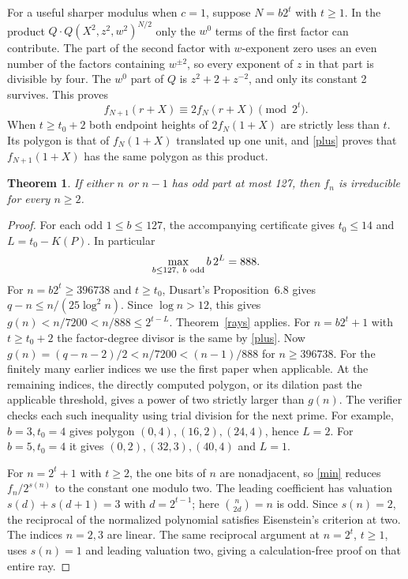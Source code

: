 \documentclass[11pt]{article}
\newtheorem{theorem}{Theorem}
\begin{document}
For a useful sharper modulus when $c=1$, suppose $N=b2^t$ with $t\ge1$. In the product $Q\cdot Q(X^2,z^2,w^2)^{N/2}$ only the $w^0$ terms of the first factor can contribute. The part of the second factor with $w$-exponent zero uses an even number of the factors containing $w^{\pm2}$, so every exponent of $z$ in that part is divisible by four. The $w^0$ part of $Q$ is $z^2+2+z^{-2}$, and only its constant 2 survives. This proves
\begin{equation}
 f_{N+1}(r+X)\equiv 2 f_N(r+X)\pmod {2^t}.\label{plus}
\end{equation}
When $t\ge t_0+2$ both endpoint heights of $2 f_N(1+X)$ are strictly less than $t$. Its polygon is that of $f_N(1+X)$ translated up one unit, and \eqref{plus} proves that $f_{N+1}(1+X)$ has the same polygon as this product.
\begin{theorem}
If either $n$ or $n-1$ has odd part at most 127, then $f_n$ is irreducible for every $n\ge2$.
\end{theorem}
\begin{proof}
For each odd $1\le b\le127$, the accompanying certificate gives $t_0\le14$ and $L=t_0-K(P)$. In particular
\[
 \max_{b\le 127,\ b\ {\rm odd}} b\,2^L=888.
\]
For $n=b2^t\ge396738$ and $t\ge t_0$, Dusart's Proposition~6.8 \cite{dusart} gives $q-n\le n/(25\log^2 n)$. Since $\log n>12$, this gives $g(n)<n/7200<n/888\le2^{t-L}$. Theorem~\ref{rays} applies. For $n=b2^t+1$ with $t\ge t_0+2$ the factor-degree divisor is the same by \eqref{plus}. Now $g(n)=(q-n-2)/2<n/7200<(n-1)/888$ for $n\ge396738$. For the finitely many earlier indices we use the first paper when applicable. At the remaining indices, the directly computed polygon, or its dilation past the applicable threshold, gives a power of two strictly larger than $g(n)$. The verifier checks each such inequality using trial division for the next prime. For example, $b=3,t_0=4$ gives polygon $(0,4),(16,2),(24,4)$, hence $L=2$. For $b=5,t_0=4$ it gives $(0,2),(32,3),(40,4)$ and $L=1$.

For $n=2^t+1$ with $t\ge2$, the one bits of $n$ are nonadjacent, so \eqref{min} reduces $f_n/2^{s(n)}$ to the constant one modulo two. The leading coefficient has valuation $s(d)+s(d+1)=3$ with $d=2^{t-1}$; here $\binom n{2d}=n$ is odd. Since $s(n)=2$, the reciprocal of the normalized polynomial satisfies Eisenstein's criterion at two. The indices $n=2,3$ are linear. The same reciprocal argument at $n=2^t$, $t\ge1$, uses $s(n)=1$ and leading valuation two, giving a calculation-free proof on that entire ray.\end{proof}
\end{document}
